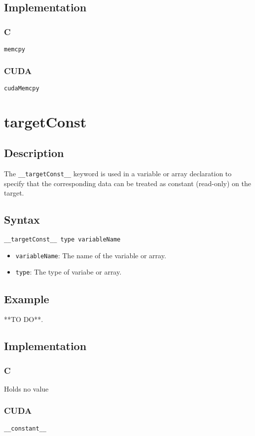 \subsection{Implementation}
\subsubsection{C}
\verb+memcpy+
\subsubsection{CUDA}
\verb+cudaMemcpy+


\newpage
\section{targetConst}
\subsection{Description}

The \verb+__targetConst__+ keyword is used in a variable or array declaration
to specify that the corresponding data can be treated as constant (read-only) on the target.

\subsection{Syntax}
\begin{verbatim}
__targetConst__ type variableName
\end{verbatim}

\begin{itemize}
\item \verb+variableName+: The name of the variable or array.
\item \verb+type+: The type of variabe or array.
\end{itemize}


\subsection{Example}
**TO DO**.
\subsection{Implementation}
\subsubsection{C}
Holds no value
\subsubsection{CUDA}
\verb+__constant__+

